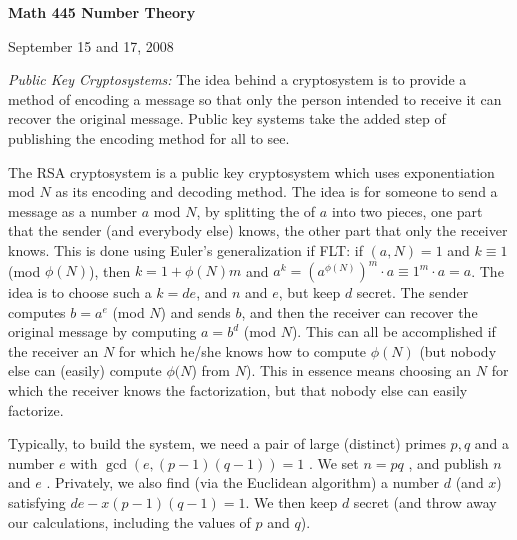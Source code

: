 




\nopagenumbers


\def\ctln{\centerline}
\def\u{\underbar}
\def\ssk{\smallskip}
\def\msk{\medskip}
\def\bsk{\bigskip}


\ctln{\bf Math 445 Number Theory}

\medskip

\ctln{September 15 and 17, 2008}

\bsk

{\it Public Key Cryptosystems:} The idea behind a cryptosystem is to provide a
method of encoding a message so that only the person intended to receive it
can recover the original message. Public key systems take the added step
of publishing the encoding method for all to see.

\msk

The RSA cryptosystem is a public key cryptosystem which uses exponentiation
mod $N$ as its encoding and decoding method. The idea is 
for someone to send a message as a number $a$ mod $N$, by splitting
the  of $a$ into two pieces, one part that the 
sender (and everybody else) knows, the other part that only the 
receiver knows. This is done using Euler's generalization if FLT:
if $(a,N)=1$ and $k\equiv 1$ (mod $\phi(N)$), then 
$k=1+\phi(N)m$ and $a^k=(a^{\phi(N)})^m\cdot a\equiv 1^m\cdot a=a$.
The idea is to choose such a $k=de$, and  $n$ and $e$,
but keep $d$ secret. The sender computes $b=a^e$ (mod $N$) and sends $b$,
and then the receiver can recover the original message by computing
$a=b^d$ (mod $N$). This can all be accomplished if the receiver 
an $N$ for which he/she knows how to compute $\phi(N)$ (but nobody
else can (easily) compute $\phi(N$) from $N$). This in essence means choosing
an $N$ for which the receiver knows the factorization, but that nobody else can
easily factorize. 

\msk

Typically, to build the system, we need a pair
of large (distinct) primes $p,q$ and a number $e$ with $\gcd(e,(p-1)(q-1))=1$ . We
set $n=pq$ , and publish $n$ and $e$ . Privately, we also find (via the Euclidean
algorithm) a number $d$ (and $x$) satisfying $de-x(p-1)(q-1) = 1$. We then keep 
$d$ secret (and throw away our calculations, including the values of $p$ and $q$).

\msk

